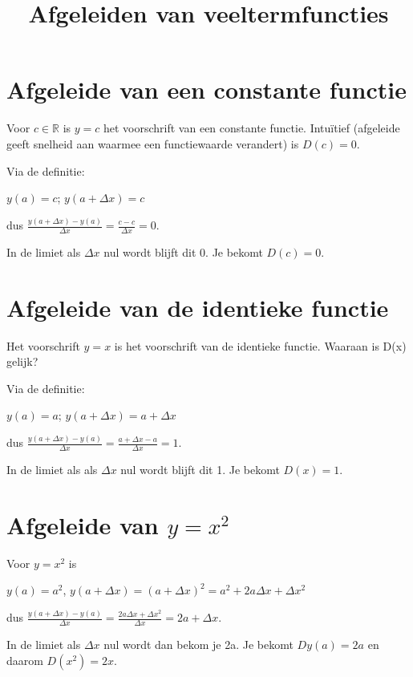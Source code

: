 \documentclass{article}
\title{Afgeleiden van veeltermfuncties}
\date { }
\begin{document}
\maketitle \noindent

\section{Afgeleide van een constante functie}

Voor $c\in \mathbb{R}$ is $y=c$ het voorschrift van een constante functie.
Intu\"itief (afgeleide geeft snelheid aan waarmee een functiewaarde verandert) is $D(c)=0$.\vspace{3 mm}

\noindent Via de definitie:

$y(a)=c$; $y(a+\Delta x)=c$

dus $\frac{y(a+ \Delta x)-y(a)}{\Delta x}=\frac {c-c}{\Delta x}=0$.\vspace{2mm}

\noindent In de limiet als $\Delta x$ nul wordt blijft dit 0.
Je bekomt $D(c)=0$.

\section{Afgeleide van de identieke functie}

Het voorschrift $y=x$ is het voorschrift van de identieke functie.
Waaraan is D(x) gelijk?\vspace{3mm}

\noindent Via de definitie:

$y(a)=a$; $y(a+\Delta x)=a+\Delta x$

dus $\frac{y(a+\Delta x)-y(a)}{\Delta x}=\frac{a+\Delta x -a}{\Delta x}=1$.\vspace{2mm}

\noindent In de limiet als als $\Delta x$ nul wordt blijft dit 1.
Je bekomt $D(x)=1$.

\section{Afgeleide van $y=x^2$}

\noindent Voor $y=x^2$ is

$y(a)=a^2$, $y(a+\Delta x)=(a+\Delta x)^2=a^2+2a\Delta x + \Delta x^2$

dus $\frac{y(a+\Delta x)-y(a)}{\Delta x}=\frac{2a \Delta x +\Delta x^2}{\Delta x}=2a+ \Delta x$.

\noindent In de limiet als $\Delta x$ nul wordt dan bekom je 2a.
Je bekomt $Dy(a)=2a$ en daarom $D(x^2)=2x$.
\end{document}
